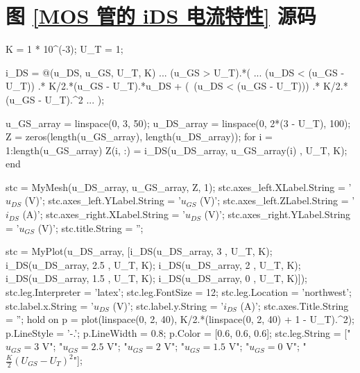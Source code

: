 \documentclass[UTF8]{report}
\theoremstyle{MyLineTheoremStyle} %
\theoremstyle{MyBlockTheoremStyle} %
\theoremstyle{MySubsubsectionStyle} %
\begin{document}
\section{图 \ref{MOS 管的 iDS 电流特性} 源码}\label{MOS 管的 iDS 电流特性源码}
\begin{matlablisting}

K = 1 * 10^(-3);
U_T = 1;

i_DS = @(u_DS, u_GS, U_T, K) ... 
    (u_GS > U_T).*(   ...
        (u_DS < (u_GS - U_T)) .* K/2.*(u_GS - U_T).*u_DS + (~(u_DS < (u_GS - U_T))) .* K/2.*(u_GS - U_T).^2  ...
    );

u_GS_array = linspace(0, 3, 50);
u_DS_array = linspace(0, 2*(3 - U_T), 100);
Z = zeros(length(u_GS_array), length(u_DS_array));
for i = 1:length(u_GS_array)
    Z(i, :) = i_DS(u_DS_array, u_GS_array(i) , U_T, K);
end

stc = MyMesh(u_DS_array, u_GS_array, Z, 1);
stc.axes_left.XLabel.String =  '$u_{DS}$ (V)';
stc.axes_left.YLabel.String =  '$u_{GS}$ (V)';
stc.axes_left.ZLabel.String =  '$i_{DS}$ (A)';
stc.axes_right.XLabel.String =  '$u_{DS}$ (V)';
stc.axes_right.YLabel.String =  '$u_{GS}$ (V)';
stc.title.String = '';

stc = MyPlot(u_DS_array, [i_DS(u_DS_array, 3 , U_T, K); i_DS(u_DS_array, 2.5 , U_T, K); i_DS(u_DS_array, 2 , U_T, K); i_DS(u_DS_array, 1.5 , U_T, K); i_DS(u_DS_array, 0 , U_T, K)]);
stc.leg.Interpreter = 'latex';
stc.leg.FontSize = 12;
stc.leg.Location = 'northwest';
stc.label.x.String = '$u_{DS}$ (V)';
stc.label.y.String = '$i_{DS}$ (A)';
stc.axes.Title.String = '';
hold on 
p = plot(linspace(0, 2, 40), K/2.*(linspace(0, 2, 40) + 1 - U_T).^2);
p.LineStyle = '-.';
p.LineWidth = 0.8;
p.Color = [0.6, 0.6, 0.6];
stc.leg.String = ["$u_{GS} = 3$ V"; "$u_{GS} = 2.5$ V"; "$u_{GS} = 2$ V"; "$u_{GS} = 1.5$ V"; "$u_{GS} = 0$ V"; "$\frac{K}{2}(U_{GS} - U_{T})^2$"];
\end{matlablisting}
\end{document}
